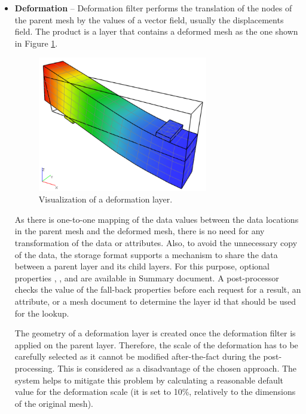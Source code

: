 \begin{itemize}

    \item \textbf{Deformation} -- Deformation filter performs the translation of the nodes of the parent mesh by the values of a vector field, usually the displacements field. The product is a layer that contains a deformed mesh as the one shown in Figure \ref{fig:beam-deformation-layer}.

    \begin{figure}[H]
        \centering
        \includegraphics[width=0.7\textwidth]{figures/chapter-data-management/beam-deformation-layer}
        \decoRule
        \caption{Visualization of a deformation layer.}
        \label{fig:beam-deformation-layer}
    \end{figure}
    
    As there is one-to-one mapping of the data values between the data locations in the parent mesh and the deformed mesh, there is no need for any transformation of the data or attributes. Also, to avoid the unnecessary copy of the data, the storage format supports a mechanism to share the data between a parent layer and its child layers. For this purpose, optional properties , , and  are available in Summary document. A post-processor checks the value of the fall-back properties before each request for a result, an attribute, or a mesh document to determine the layer id that should be used for the lookup.
    
    The geometry of a deformation layer is created once the deformation filter is applied on the parent layer. Therefore, the scale of the deformation has to be carefully selected as it cannot be modified after-the-fact during the post-processing. This is considered as a disadvantage of the chosen approach. The system helps to mitigate this problem by calculating a reasonable default value for the deformation scale (it is set to 10\%, relatively to the dimensions of the original mesh).


\end{itemize}
